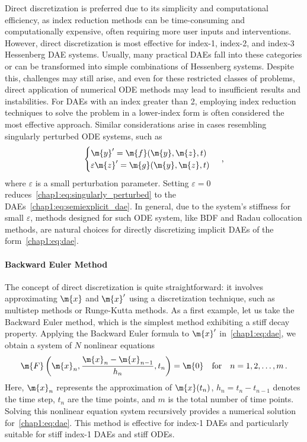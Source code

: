 Direct discretization is preferred due to its simplicity and computational efficiency, as index reduction methods can be time-consuming and computationally expensive, often requiring more user inputs and interventions. However, direct discretization is most effective for index-1, index-2, and index-3 Hessenberg \ac{DAE} systems. Usually, many practical \acp{DAE} fall into these categories or can be transformed into simple combinations of Hessenberg systems. Despite this, challenges may still arise, and even for these restricted classes of problems, direct application of numerical \ac{ODE} methods may lead to insufficient results and instabilities. For \acp{DAE} with an index greater than 2, employing index reduction techniques to solve the problem in a lower-index form is often considered the most effective approach. Similar considerations arise in cases resembling singularly perturbed \ac{ODE} systems, such as
%
\begin{equation}
  \begin{cases}
  \m{y}^{\prime} = \m{f}(\m{y}, \m{z}, t) \\
  \varepsilon \m{z}^{\prime} = \m{g}(\m{y}, \m{z}, t)
  \end{cases} \, \text{,}
  \label{chap1:eq:singularly_perturbed}
\end{equation}
%
where $\varepsilon$ is a small perturbation parameter. Setting $\varepsilon = 0$ reduces~\eqref{chap1:eq:singularly_perturbed} to the \acp{DAE}~\eqref{chap1:eq:semiexplicit_dae}. In general, due to the system's stiffness for small $\varepsilon$, methods designed for such \ac{ODE} system, like \ac{BDF} and Radau collocation methods, are natural choices for directly discretizing implicit \acp{DAE} of the form~\eqref{chap1:eq:dae}.

\paragraph{Backward Euler Method}

The concept of direct discretization is quite straightforward: it involves approximating $\m{x}$ and $\m{x}^{\prime}$ using a discretization technique, such as multistep methods or Runge-Kutta methods. As a first example, let us take the Backward Euler method, which is the simplest method exhibiting a stiff decay property. Applying the Backward Euler formula to $\m{x}^{\prime}$ in~\eqref{chap1:eq:dae}, we obtain a system of $N$ nonlinear equations
%
\begin{equation}
  \m{F}\left(\m{x}_n, \dfrac{\m{x}_n - \m{x}_{n-1}}{h_n}, t_n\right) = \m{0} \quad \text{for} \quad n = 1, 2, \dots, m \, \text{.}
  \label{chap1:eq:backward_euler}
\end{equation}
%
Here, $\m{x}_n$ represents the approximation of $\m{x}(t_n)$, $h_n = t_n - t_{n-1}$ denotes the time step, $t_n$ are the time points, and $m$ is the total number of time points. Solving this nonlinear equation system recursively provides a numerical solution for~\eqref{chap1:eq:dae}. This method is effective for index-1 \acp{DAE} and particularly suitable for stiff index-1 \acp{DAE} and stiff \acp{ODE}.

